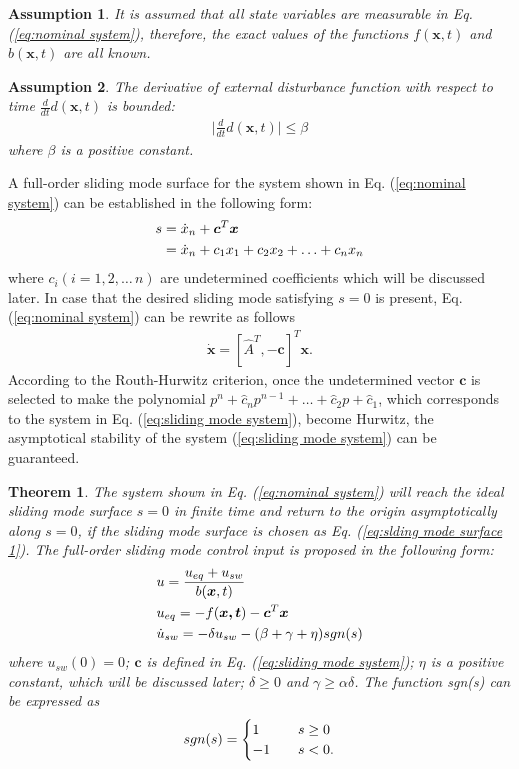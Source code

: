 \documentclass[conference]{IEEEtran}
\theoremstyle{plain}
\newtheorem{myass}{Assumption}
\newtheorem{mythm}{Theorem}
\begin{document}
\begin{myass}
It is assumed that all state variables are measurable in Eq. (\ref{eq:nominal system}), therefore, the exact values of the functions $f(\bm{x},t)$ and $b(\bm{x},t)$ are all known.
\end{myass}
\begin{myass}
The derivative of external disturbance function with respect to time $\frac{d}{dt}d(\bm{x},t)$ is bounded:
\begin{align}
\vert\frac{d}{dt}d(\bm{x},t)\vert\le \beta \label{eq:dd}
\end{align}
where $\beta$ is a positive constant.
\end{myass}
A full-order sliding mode surface for the system shown in Eq. (\ref{eq:nominal system}) can be established in the following form:
\begin{align}
s&=\dot x_n +\bm{c}^T\bm{x}\notag\\
&= \dot x_n + c_1x_1+c_2x_2+\ldots+c_nx_n\label{eq:slding mode surface 1}
\end{align}
where $c_i(i=1,2,\ldots\,n)$ are undetermined coefficients which will be discussed later. In case that the desired sliding mode satisfying $s = 0$ is present, Eq. (\ref{eq:nominal system}) can be rewrite as follows
\begin{align}
\dot{\bm{x}} = [\hat{A}^T,-\bm{c}]^T\bm{x}.\label{eq:sliding mode system}
\end{align}
According to the Routh-Hurwitz criterion, once the undetermined vector $\bm{c}$ is selected to make the polynomial $p^n+\hat c_np^{n-1}+\ldots+\hat c_2p+\hat c_1$, which corresponds to the system in Eq. (\ref{eq:sliding mode system}), become Hurwitz, the asymptotical stability of the system (\ref{eq:sliding mode system}) can be guaranteed.\par
\begin{mythm}\label{thm:1}
The system shown in Eq. (\ref{eq:nominal system}) will reach the ideal sliding mode surface $s=0$ in finite time and return to the origin asymptotically along $s=0$, if the sliding mode surface is chosen as Eq. (\ref{eq:slding mode surface 1}). The full-order sliding mode control input is proposed in the following form:
\begin{align}
&u = \frac{u_{eq}+u_{sw}}{b(\bm{x},t)}\label{eq:linear u}\\
&u_{eq}=-f(\bm{x,t})-\bm{c}^T\bm{x}\notag\\
&\dot u_{sw}=-\delta u_{sw}-(\beta+\gamma+\eta)sgn(s)\label{eq:solution of u_sw}
\end{align}
where $u_{sw}(0) = 0$; $\bm{c}$ is defined in Eq. (\ref{eq:sliding mode system}); $\eta$ is a positive constant, which will be discussed later; $\delta\ge 0$ and $\gamma\ge\alpha \delta$. The function sgn(s) can be expressed as
\begin{align}
sgn(s)=\begin{cases}
1\quad &s \ge 0\\
-1\quad &s < 0.
\end{cases}\notag
\end{align}
\end{mythm}
\end{document}
